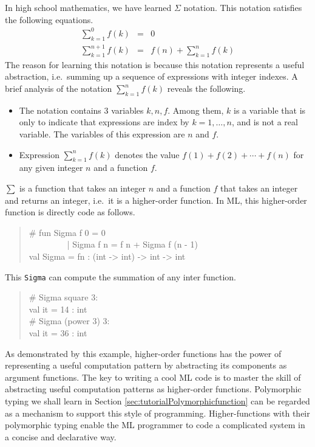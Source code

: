 \documentclass{jbook}
\newenvironment{program}{\begin{quote}\begin{tt}}%
                        {\end{tt}\end{quote}}
\begin{document}
	In high school mathematics, we have learned $\Sigma$ notation.
	This notation satisfies the following equations.
\begin{eqnarray*}
\sum_{k=1}^0 f(k) &=& 0\\
\sum_{k=1}^{n+1} f(k) &=& f(n) + \sum_{k=1}^{n} f(k)
\end{eqnarray*}
	The reason for learning this notation is because this notation
represents a useful abstraction, i.e.\ summing up a sequence of
expressions with integer indexes.
	A brief analysis of the notation $\sum_{k=1}^n f(k)$ reveals the
following.
\begin{itemize}
\item The notation contains 3 variables $k,n,f$.
	Among them, $k$ is a variable that is only to indicate that
expressions are index by $k=1,\ldots,n$, and is not a real variable. 
	The variables of this expression are $n$ and $f$.
\item Expression $\sum_{k=1}^n f(k)$ denotes the value
$
f(1) + f(2) + \cdots + f(n)
$
for any given integer $n$ and a function $f$.
\end{itemize}
	$\sum$ is a function that takes an integer $n$ and a function
$f$ that takes an integer and returns an integer, i.e.\ it is a
higher-order function.
	In ML, this higher-order function is directly code as follows.
\begin{program}
\# fun Sigma f 0 = 0\\
\ \ \ \ \ \ \ \ \  | Sigma f n = f n + Sigma f (n - 1)\\
val Sigma = fn : (int -> int) -> int -> int
\end{program}
	This {\tt Sigma} can compute the summation of any inter function.
\begin{program}
\# Sigma square 3:\\
val it = 14 : int\\
\# Sigma (power 3) 3:\\
val it = 36 : int
\end{program}

	As demonstrated by this example, higher-order functions has the
power of representing a useful computation pattern by abstracting its
components as argument functions.
	The key to writing a cool ML code is to master the skill of
abstracting useful computation patterns as higher-order functions.
	Polymorphic typing we shall learn in Section
\ref{sec:tutorialPolymorphicfunction} can be regarded as a mechanism to
support this style of programming. 
	Higher-functions with their polymorphic typing enable the ML
programmer to code a complicated system in a concise and declarative
way.
\end{document}
